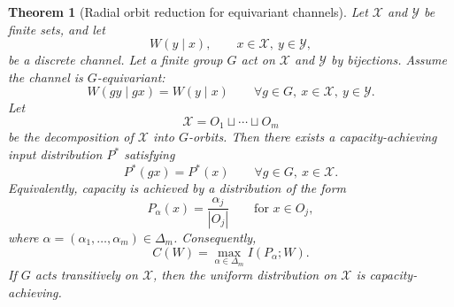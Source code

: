 \documentclass[11pt]{article}
\newtheorem{theorem}{Theorem}
\theoremstyle{definition}
\theoremstyle{remark}
\newcommand{\1}{\mathbf 1}
\begin{document}
\begin{theorem}[Radial orbit reduction for equivariant channels]\label{thm:orbit-reduction}
Let \(\mathcal X\) and \(\mathcal Y\) be finite sets, and let
\[
  W(y\mid x),\qquad x\in\mathcal X,
  \ y\in\mathcal Y,
\]
be a discrete channel.  Let a finite group \(G\) act on \(\mathcal X\) and \(\mathcal Y\) by bijections.  Assume the channel is \(G\)-equivariant:
\[
  W(gy\mid gx)=W(y\mid x)
  \qquad\forall g\in G,
  \ x\in\mathcal X,
  \ y\in\mathcal Y.
\]
Let
\[
  \mathcal X=O_1\sqcup\cdots\sqcup O_m
\]
be the decomposition of \(\mathcal X\) into \(G\)-orbits.  Then there exists a capacity-achieving input distribution \(P^*\) satisfying
\[
  P^*(gx)=P^*(x)\qquad\forall g\in G,
  \ x\in\mathcal X.
\]
Equivalently, capacity is achieved by a distribution of the form
\[
  P_\alpha(x)=\frac{\alpha_j}{|O_j|}
  \qquad\text{for }x\in O_j,
\]
where \(\alpha=(\alpha_1,\ldots,\alpha_m)\in\Delta_m\).  Consequently,
\[
  C(W)=\max_{\alpha\in\Delta_m} I(P_\alpha;W).
\]
If \(G\) acts transitively on \(\mathcal X\), then the uniform distribution on \(\mathcal X\) is capacity-achieving.
\end{theorem}
\end{document}
